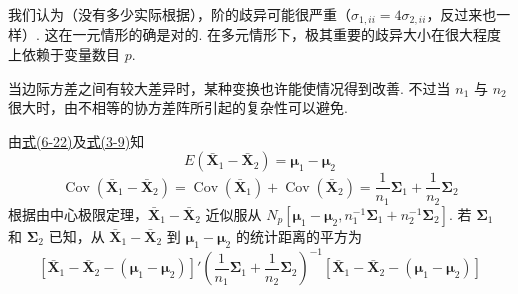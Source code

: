 我们认为（没有多少实际根据），阶的歧异可能很严重（$\sigma_{1,ii}=4\sigma_{2,ii}$，反过来也一样）. 这在一元情形的确是对的. 在多元情形下，极其重要的歧异大小在很大程度上依赖于变量数目 $p$.

当边际方差之间有较大差异时，某种变换也许能使情况得到改善. 不过当 $n_1$ 与 $n_2$ 很大时，由不相等的协方差阵所引起的复杂性可以避免.


\quad 由\hyperref[eq:6-22]{式(6-22)}及\hyperref[eq:3-9]{式(3-9)}知
\[
E(\bar{\mathbf{X}}_1-\bar{\mathbf{X}}_2)=\boldsymbol{\mu}_1-\boldsymbol{\mu}_2
\]
\[
\operatorname{Cov}(\bar{\mathbf{X}}_1-\bar{\mathbf{X}}_2)=\operatorname{Cov}(\bar{\mathbf{X}}_1)+\operatorname{Cov}(\bar{\mathbf{X}}_2)=\frac{1}{n_1}\boldsymbol{\Sigma}_1+\frac{1}{n_2}\boldsymbol{\Sigma}_2
\]
根据由中心极限定理，$\bar{\mathbf{X}}_1-\bar{\mathbf{X}}_2$ 近似服从 $N_p\left[\boldsymbol{\mu}_1-\boldsymbol{\mu}_2,n_1^{-1}\boldsymbol{\Sigma}_1+n_2^{-1}\boldsymbol{\Sigma}_2\right]$. 若 $\boldsymbol{\Sigma}_1$ 和 $\boldsymbol{\Sigma}_2$ 已知，从 $\bar{\mathbf{X}}_1-\bar{\mathbf{X}}_2$ 到 $\boldsymbol{\mu}_1-\boldsymbol{\mu}_2$ 的统计距离的平方为
\[
[\bar{\mathbf{X}}_1-\bar{\mathbf{X}}_2-(\boldsymbol{\mu}_1-\boldsymbol{\mu}_2)]'\left(\frac{1}{n_1}\boldsymbol{\Sigma}_1+\frac{1}{n_2}\boldsymbol{\Sigma}_2\right)^{-1}[\bar{\mathbf{X}}_1-\bar{\mathbf{X}}_2-(\boldsymbol{\mu}_1-\boldsymbol{\mu}_2)]
\]

